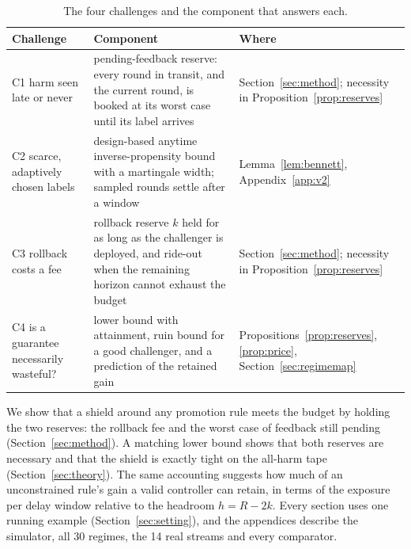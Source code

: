 \documentclass[10pt]{article}
\theoremstyle{plain}
\theoremstyle{definition}
\begin{document}
\begin{table}[t]
\caption{The four challenges and the component that answers each.}\label{tab:challenges}
\centering\small
\begin{tabular}{@{}p{3.7cm} p{6.6cm} p{3.9cm}@{}}
\toprule
Challenge & Component & Where \\
\midrule
C1 harm seen late or never & pending-feedback reserve: every round in transit, and the current round, is booked at its worst case until its label arrives & Section~\ref{sec:method}; necessity in Proposition~\ref{prop:reserves} \\
C2 scarce, adaptively chosen labels & design-based anytime inverse-propensity bound with a martingale width; sampled rounds settle after a window & Lemma~\ref{lem:bennett}, Appendix~\ref{app:v2} \\
C3 rollback costs a fee & rollback reserve $k$ held for as long as the challenger is deployed, and ride-out when the remaining horizon cannot exhaust the budget & Section~\ref{sec:method}; necessity in Proposition~\ref{prop:reserves} \\
C4 is a guarantee necessarily wasteful? & lower bound with attainment, ruin bound for a good challenger, and a prediction of the retained gain & Propositions~\ref{prop:reserves}, \ref{prop:price}, Section~\ref{sec:regimemap} \\
\bottomrule
\end{tabular}
\end{table}

We show that a shield around any promotion rule meets the budget by holding the two reserves: the rollback fee and the worst case of feedback still pending (Section~\ref{sec:method}).
A matching lower bound shows that both reserves are necessary and that the shield is exactly tight on the all-harm tape (Section~\ref{sec:theory}).
The same accounting suggests how much of an unconstrained rule's gain a valid controller can retain, in terms of the exposure per delay window relative to the headroom $h=R-2k$.
Every section uses one running example (Section~\ref{sec:setting}), and the appendices describe the simulator, all 30 regimes, the 14 real streams and every comparator.
\end{document}
